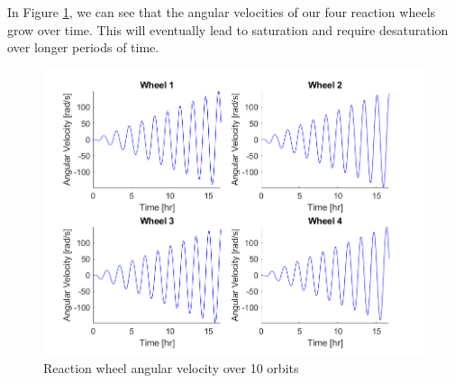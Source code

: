 In Figure \ref{fig:ps9_problem3_wheelMomentum_nonlinear}, we can see that the angular velocities of our four reaction wheels grow over time. This will eventually lead to saturation and require desaturation over longer periods of time.

\begin{figure}[H]
\centering
\includegraphics[scale=0.7]{Images/ps9_problem3_wheelMomentum_nonlinear.png}
\caption{Reaction wheel angular velocity over 10 orbits}
\label{fig:ps9_problem3_wheelMomentum_nonlinear}
\end{figure}
